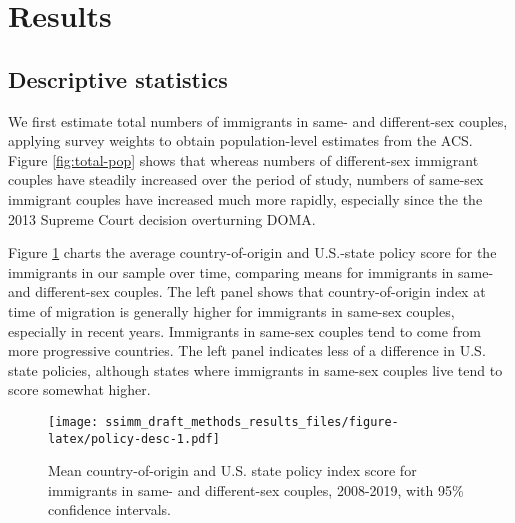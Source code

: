 \documentclass[
  11pt,
]{article}
\begin{document}
\hypertarget{results}{%
\section{Results}\label{results}}

\hypertarget{descriptive-statistics}{%
\subsection{Descriptive statistics}\label{descriptive-statistics}}

We first estimate total numbers of immigrants in same- and different-sex couples, applying survey weights to obtain population-level estimates from the ACS. Figure \ref{fig:total-pop} shows that whereas numbers of different-sex immigrant couples have steadily increased over the period of study, numbers of same-sex immigrant couples have increased much more rapidly, especially since the the 2013 Supreme Court decision overturning DOMA.

Figure \ref{fig:policy-desc} charts the average country-of-origin and U.S.-state policy score for the immigrants in our sample over time, comparing means for immigrants in same- and different-sex couples. The left panel shows that country-of-origin index at time of migration is generally higher for immigrants in same-sex couples, especially in recent years. Immigrants in same-sex couples tend to come from more progressive countries. The left panel indicates less of a difference in U.S. state policies, although states where immigrants in same-sex couples live tend to score somewhat higher.

\begin{figure}
\centering
\texttt{[image: ssimm\_draft\_methods\_results\_files/figure-latex/policy-desc-1.pdf]}
\caption{\label{fig:policy-desc}Mean country-of-origin and U.S. state policy index score for immigrants in same- and different-sex couples, 2008-2019, with 95\% confidence intervals.}
\end{figure}
\end{document}
